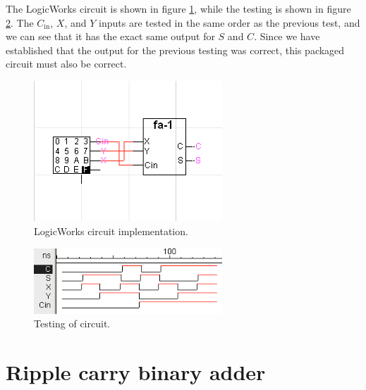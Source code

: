 \documentclass[11pt]{article}
\begin{document}
\begin{enumerate}[(a)]
{	The LogicWorks circuit is shown in figure \ref{fig:1dc}, while the testing is shown in figure \ref{fig:1dt}. The $C_{\text{in}}$, $X$, and $Y$ inputs are tested in the same order as the previous test, and we can see that it has the exact same output for $S$ and $C$. Since we have established that the output for the previous testing was correct, this packaged circuit must also be correct.

		\begin{figure}[h]
			\centering
			\includegraphics[width=200pt]{1pc}
			\caption{\label{fig:1dc} LogicWorks circuit implementation.}
		\end{figure}

		\begin{figure}[h]
			\centering
			\includegraphics[width=200pt]{1pt}
			\caption{\label{fig:1dt} Testing of circuit.}
		\end{figure}
	}
\end{enumerate}

\section{Ripple carry binary adder}
\end{document}
